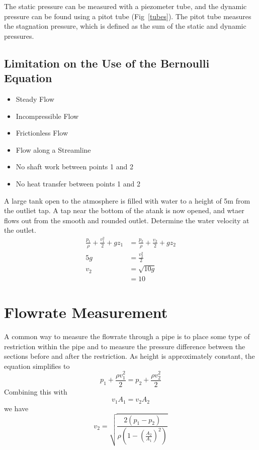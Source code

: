 \documentclass[12pt]{article}
\begin{document}
The static pressure can be measured with a piezometer tube, and the dynamic pressure can be found using a pitot tube (Fig~\ref{tubes}). The pitot tube measures the stagnation pressure, which is defined as the sum of the static and dynamic pressures.

\subsection{Limitation on the Use of the Bernoulli Equation}

\begin{itemize}
	\item Steady Flow
	\item Incompressible Flow
	\item Frictionless Flow
	\item Flow along a Streamline
	\item No shaft work between points 1 and 2
	\item No heat transfer between points 1 and 2
\end{itemize}

\begin{ex}
	A large tank open to the atmosphere is filled with water to a height of 5m from the outliet tap. A tap near the bottom of the atank is now opened, and wtaer flows out from the smooth and rounded outlet. Determine the water velocity at the outlet.
	\begin{align*}
		\frac{p_1}{\rho} + \frac{v_1^2}{2} + gz_1 &= \frac{p_2}{\rho} + \frac{v_2}{2} + gz_2 \\
		5g &= \frac{v_2^2}{2} \\
		v_2 &= \sqrt{10g} \\
		    &= 10
	\end{align*}
\end{ex}

\section{Flowrate Measurement}

A common way to measure the flowrate through a pipe is to place some type of restriction within the pipe and to measure the pressure difference between the sections before and after the restriction. As height is approximately constant, the equation simplifies to
$$p_1 + \frac{\rho v_1^2}{2} = p_2 + \frac{\rho v_2^2}{2}$$
Combining this with
$$v_1A_1 = v_2A_2$$
we have
$$v_2 = \sqrt{\frac{2(p_1-p_2)}{\rho\left(1-\left(\frac{A_2}{A_1}\right)^2\right)}}$$
\end{document}
